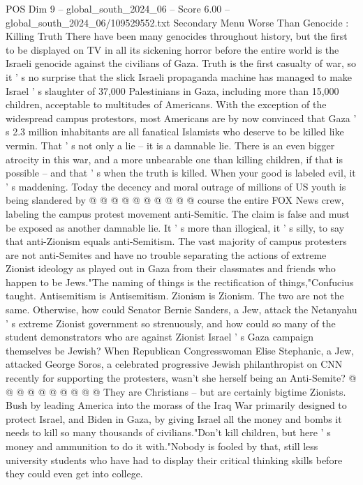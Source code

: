 \begin{textsample}{POS Dim 9 – global\_south\_2024\_06 – Score 6.00 – global\_south\_2024\_06/109529552.txt}  \label{ex:f9_pos_052}
Secondary Menu Worse Than Genocide : Killing Truth There have been many genocides throughout history, but the first to be displayed on TV in all its sickening horror before the entire world is the Israeli genocide against the civilians of Gaza.
Truth is the first casualty of war, so it ' s no surprise that the slick Israeli propaganda machine has managed to make Israel ' s slaughter of 37,000 Palestinians in Gaza, including more than 15,000 children, acceptable to multitudes of Americans.
With the exception of the widespread campus protestors, most Americans are by now convinced that Gaza ' s 2.3 million inhabitants are all fanatical Islamists who deserve to be killed like vermin.
That ' s not only a lie -- it is a damnable lie.
There is an even bigger atrocity in this war, and a more unbearable one than killing children, if that is possible -- and that ' s when the truth is killed.
When your good is labeled evil, it ' s maddening.
Today the decency and moral outrage of millions of US youth is being slandered by @ @ @ @ @ @ @ @ @ @ course the entire FOX News crew, labeling the campus protest movement anti-Semitic.
The claim is false and must be exposed as another damnable lie.
It ' s more than illogical, it ' s silly, to say that anti-Zionism equals anti-Semitism.
The vast majority of campus protesters are not anti-Semites and have no trouble separating the actions of extreme Zionist ideology as played out in Gaza from their classmates and friends who happen to be Jews."The naming of things is the rectification of things,"Confucius taught.
Antisemitism is Antisemitism.
Zionism is Zionism.
The two are not the same.
Otherwise, how could Senator Bernie Sanders, a Jew, attack the Netanyahu ' s extreme Zionist government so strenuously, and how could so many of the student demonstrators who are against Zionist Israel ' s Gaza campaign themselves be Jewish?
When Republican Congresswoman Elise Stephanic, a Jew, attacked George Soros, a celebrated progressive Jewish philanthropist on CNN recently for supporting the protesters, wasn't she herself being an Anti-Semite? @ @ @ @ @ @ @ @ @ @ They are Christians -- but are certainly bigtime Zionists.
Bush by leading America into the morass of the Iraq War primarily designed to protect Israel, and Biden in Gaza, by giving Israel all the money and bombs it needs to kill so many thousands of civilians."Don't kill children, but here ' s money and ammunition to do it with."Nobody is fooled by that, still less university students who have had to display their critical thinking skills before they could even get into college.

\end{textsample}
